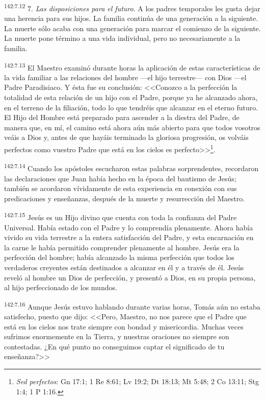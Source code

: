 \par 
\textsuperscript{142:7.12} 7. \textit{Las disposiciones para el futuro}. A los padres temporales les gusta dejar una herencia para sus hijos. La familia continúa de una generación a la siguiente. La muerte sólo acaba con una generación para marcar el comienzo de la siguiente. La muerte pone término a una vida individual, pero no necesariamente a la familia.

\par 
\textsuperscript{142:7.13} El Maestro examinó durante horas la aplicación de estas características de la vida familiar a las relaciones del hombre ---el hijo terrestre--- con Dios ---el Padre Paradisiaco. Y ésta fue su conclusión: <<Conozco a la perfección la totalidad de esta relación de un hijo con el Padre, porque ya he alcanzado ahora, en el terreno de la filiación, todo lo que tendréis que alcanzar en el eterno futuro. El Hijo del Hombre está preparado para ascender a la diestra del Padre, de manera que, en mí, el camino está ahora aún más abierto para que todos vosotros veáis a Dios y, antes de que hayáis terminado la gloriosa progresión, os volváis perfectos como vuestro Padre que está en los cielos es perfecto>>\footnote{\textit{Sed perfectos}: Gn 17:1; 1 Re 8:61; Lv 19:2; Dt 18:13; Mt 5:48; 2 Co 13:11; Stg 1:4; 1 P 1:16.}.

\par 
\textsuperscript{142:7.14} Cuando los apóstoles escucharon estas palabras sorprendentes, recordaron las declaraciones que Juan había hecho en la época del bautismo de Jesús; también se acordaron vívidamente de esta experiencia en conexión con sus predicaciones y enseñanzas, después de la muerte y resurrección del Maestro.

\par 
\textsuperscript{142:7.15} Jesús es un Hijo divino que cuenta con toda la confianza del Padre Universal. Había estado con el Padre y lo comprendía plenamente. Ahora había vivido su vida terrestre a la entera satisfacción del Padre, y esta encarnación en la carne le había permitido comprender plenamente al hombre. Jesús era la perfección del hombre; había alcanzado la misma perfección que todos los verdaderos creyentes están destinados a alcanzar en él y a través de él. Jesús reveló al hombre un Dios de perfección, y presentó a Dios, en su propia persona, al hijo perfeccionado de los mundos.

\par 
\textsuperscript{142:7.16} Aunque Jesús estuvo hablando durante varias horas, Tomás aún no estaba satisfecho, puesto que dijo: <<Pero, Maestro, no nos parece que el Padre que está en los cielos nos trate siempre con bondad y misericordia. Muchas veces sufrimos enormemente en la Tierra, y nuestras oraciones no siempre son contestadas. ¿En qué punto no conseguimos captar el significado de tu enseñanza?>>

